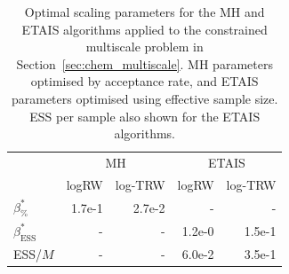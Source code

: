 \documentclass[final]{siamltex}
\newcommand{\edit}[1]{#1}
\begin{document}
\edit{
\begin{table}[!h]
	\centering
	\begin{tabular}{lrrrr}
	\toprule
		 & \multicolumn{2}{c}{MH} & \multicolumn{2}{c}{ETAIS} \\ \cmidrule(lr){2-3} \cmidrule(lr){4-5}
		& logRW & log-TRW & logRW & log-TRW \\ \midrule
		$\beta_{\%}^*$	 	& 1.7e-1 &2.7e-2 & - & - \\
		$\beta_{\text{ESS}}^*$	       & -            & -          & 1.2e-0 & 1.5e-1 \\
		ESS/$M$		 	 & -            & -            & 6.0e-2 & 3.5e-1  \\
	\bottomrule
	\end{tabular}
	\caption{Optimal scaling parameters for the MH and ETAIS
          algorithms applied to the constrained multiscale problem in
          Section~\ref{sec:chem_multiscale}. MH parameters optimised
          by acceptance rate, and ETAIS parameters optimised using
          effective sample size. ESS per sample also shown for the
          ETAIS algorithms.}
\label{tab:chem_multiscale_scaling}
\end{table}}


\end{document}

